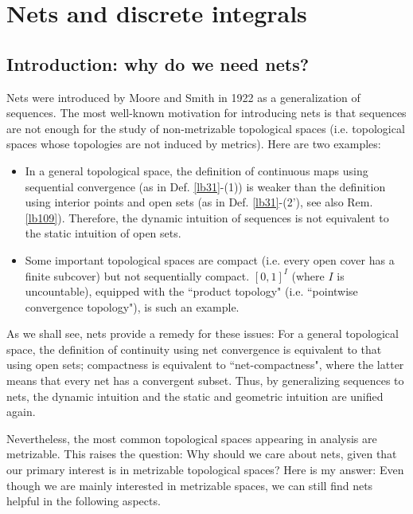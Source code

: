 \documentclass[12pt,b5paper,notitlepage]{article}
\theoremstyle{definition}
\theoremstyle{plain}
\numberwithin{equation}{section}
\begin{document}
\newpage


\section{Nets and discrete integrals}


\subsection{Introduction: why do we need nets?}



Nets were introduced by Moore and Smith in 1922 as a generalization of sequences. The most well-known motivation for introducing nets is that sequences are not enough for the study of non-metrizable topological spaces (i.e. topological spaces whose topologies are not induced by metrics). Here are two examples:
\begin{itemize}
\item In a general topological space, the definition of continuous maps using sequential convergence (as in Def. \ref{lb31}-(1)) is weaker than the definition using interior points and open sets (as in Def. \ref{lb31}-(2'), see also Rem. \ref{lb109}). Therefore, the dynamic intuition of sequences is not equivalent to the static intuition of open sets. 
\item Some important  topological spaces are compact (i.e. every open cover has a finite subcover) but not sequentially compact. $[0,1]^I$ (where $I$ is uncountable), equipped with the ``product topology" (i.e. ``pointwise convergence topology"), is such an example. 
\end{itemize}
As we shall see, nets provide a remedy for these issues: For a general topological space, the definition of continuity using net convergence is equivalent to that using open sets; compactness is equivalent to ``net-compactness", where the latter means that every net has a convergent subset. Thus, by generalizing sequences to nets, the dynamic intuition and the static and geometric intuition are unified again.


Nevertheless, the most common topological spaces appearing in analysis are metrizable. This raises the question: Why should we care about nets, given that our primary interest is in metrizable topological spaces? Here is my answer: Even though we are mainly interested in metrizable spaces, we can still find nets helpful in the following aspects. 
\end{document}
